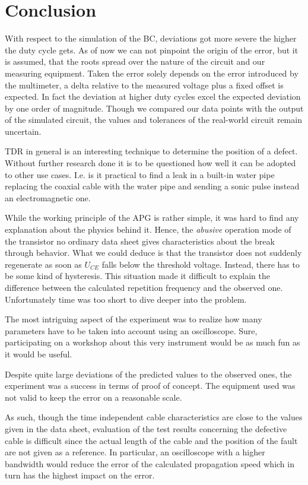 \chapter{Conclusion}
%
With respect to the simulation of the BC, deviations got more severe the higher the duty cycle gets. As of now we can not
pinpoint the origin of the error, but it is assumed, that the roots spread over the nature of the circuit and our measuring equipment.
Taken the error solely depends on the error introduced by the multimeter, a delta relative to the measured voltage plus a
fixed offset is expected. In fact the deviation at higher duty cycles excel the expected deviation by one order of magnitude.
Though we compared our data points with the output of the simulated circuit, the values and tolerances of the real-world
circuit remain uncertain.\par
%
TDR in general is an interesting technique to determine the position of a defect. Without further research done it
is to be questioned how well it can be adopted to other use cases. I.e. is it practical to find a leak in a built-in water
pipe replacing the coaxial cable with the water pipe and sending a sonic pulse instead an electromagnetic one.\par
%
While the working principle of the APG is rather simple, it was hard to find any explanation about the physics behind it.
Hence, the \textit{abusive} operation mode of the transistor no ordinary data sheet gives characteristics about the break
through behavior. What we could deduce is that the transistor does not suddenly regenerate as soon as \( U_{CE} \)
falls below the threshold voltage. Instead, there has to be some kind of hysteresis. This situation made it difficult to
explain the difference between the calculated repetition frequency and the observed one. Unfortunately time was too short
to dive deeper into the problem.\par
%
The most intriguing aspect of the experiment was to realize how many parameters have to be taken into account using an
oscilloscope. Sure, participating on a workshop about this very instrument would be as much fun as it would be useful.\par\medskip
%
Despite quite large deviations of the predicted values to the observed ones, the experiment was a success in terms of proof of concept.
The equipment used was not valid to keep the error on a reasonable scale.\par
As such, though the time independent cable characteristics are close to the values given in the data sheet, evaluation of
the test results concerning the defective cable is difficult since the actual length of the cable and the position of the fault are not
given as a reference. In particular, an oscilloscope with a higher bandwidth would reduce the error of the calculated propagation
speed which in turn has the highest impact on the error.